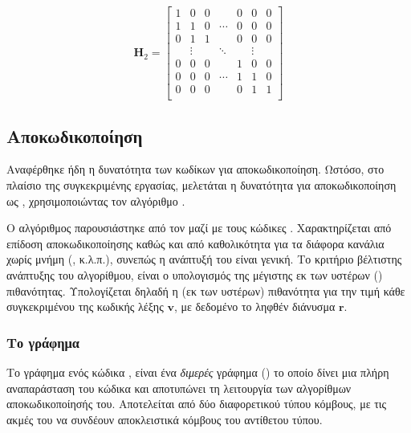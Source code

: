 \begin{equation}
\mathbf{H}_2=\begin{bmatrix}
1 & 0 & 0 &  & 0 & 0 & 0 \\
1 & 1 & 0 & \cdots & 0 & 0 & 0 \\
0 & 1 & 1 & \;\; & 0 & 0 & 0 \\
  & \vdots & & \ddots & & \vdots & \\
0 & 0 & 0 &  & 1 & 0 & 0 \\
0 & 0 & 0 & \cdots & 1 & 1 & 0 \\
0 & 0 & 0 &  & 0 & 1 & 1 \\
\end{bmatrix}
\label{eq:parity check submatrix form}
\end{equation}


\subsection{Αποκωδικοποίηση }

Αναφέρθηκε ήδη η δυνατότητα των  κωδίκων για  αποκωδικοποίηση. Ωστόσο, στο πλαίσιο της συγκεκριμένης εργασίας, μελετάται η δυνατότητα για αποκωδικοποίηση ως , χρησιμοποιώντας τον αλγόριθμο .

Ο αλγόριθμος παρουσιάστηκε από τον  μαζί με τους κώδικες . Χαρακτηρίζεται από  επίδοση αποκωδικοποίησης καθώς και από καθολικότητα για τα διάφορα κανάλια χωρίς μνήμη (, κ.λ.π.), συνεπώς η ανάπτυξή του είναι γενική. Το κριτήριο βέλτιστης ανάπτυξης του αλγορίθμου, είναι ο υπολογισμός της μέγιστης εκ των υστέρων () πιθανότητας. Υπολογίζεται δηλαδή η (εκ των υστέρων) πιθανότητα για την τιμή κάθε συγκεκριμένου  της κωδικής λέξης $\mathbf{v}$, με δεδομένο το ληφθέν διάνυσμα $\mathbf{r}$.

\subsubsection{Το γράφημα }

Το γράφημα  ενός  κώδικα \cite{tanner1981recursive}, είναι ένα \textit{διμερές} γράφημα () το οποίο δίνει μια πλήρη αναπαράσταση του κώδικα και αποτυπώνει τη λειτουργία των αλγορίθμων αποκωδικοποίησής του. Αποτελείται από δύο διαφορετικού τύπου κόμβους, με τις ακμές του να συνδέουν αποκλειστικά κόμβους του αντίθετου τύπου.

